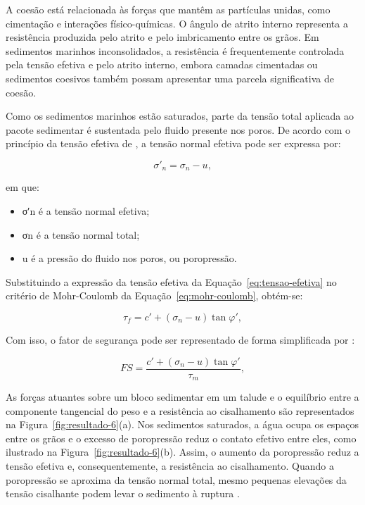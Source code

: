 A coesão está relacionada às forças que mantêm as partículas unidas, como cimentação e interações físico-químicas. O ângulo de atrito interno representa a resistência produzida pelo atrito e pelo imbricamento entre os grãos. Em sedimentos marinhos inconsolidados, a resistência é frequentemente controlada pela tensão efetiva e pelo atrito interno, embora camadas cimentadas ou sedimentos coesivos também possam apresentar uma parcela significativa de coesão.

Como os sedimentos marinhos estão saturados, parte da tensão total aplicada ao pacote sedimentar é sustentada pelo fluido presente nos poros. De acordo com o princípio da tensão efetiva de , a tensão normal efetiva pode ser expressa por:

\begin{equation}
  \sigma'_n=\sigma_n-u,
  \label{eq:tensao-efetiva}
\end{equation}

\noindent
em que:

\begin{itemize}
  \item σ′n é a tensão normal efetiva;
  \item σn é a tensão normal total;
  \item u é a pressão do fluido nos poros, ou poropressão.
\end{itemize}

Substituindo a expressão da tensão efetiva da Equação~\eqref{eq:tensao-efetiva} no critério de Mohr-Coulomb da Equação~\eqref{eq:mohr-coulomb}, obtém-se:

\begin{equation}
  \tau_f=c'+(\sigma_n-u)\tan\varphi',
  \label{eq:mohr-coulomb-poropressao}
\end{equation}

\noindent
Com isso, o fator de segurança pode ser representado de forma simplificada por \cite{caputo1988}:

\begin{equation}
  FS=\frac{c'+(\sigma_n-u)\tan\varphi'}{\tau_m},
  \label{eq:fator-seguranca-completo}
\end{equation}

\noindent
As forças atuantes sobre um bloco sedimentar em um talude e o equilíbrio entre a componente tangencial do peso e a resistência ao cisalhamento são representados na Figura~\ref{fig:resultado-6}(a). Nos sedimentos saturados, a água ocupa os espaços entre os grãos e o excesso de poropressão reduz o contato efetivo entre eles, como ilustrado na Figura~\ref{fig:resultado-6}(b). Assim, o aumento da poropressão reduz a tensão efetiva e, consequentemente, a resistência ao cisalhamento. Quando a poropressão se aproxima da tensão normal total, mesmo pequenas elevações da tensão cisalhante podem levar o sedimento à ruptura \cite{hampton1996,talling2014}.

